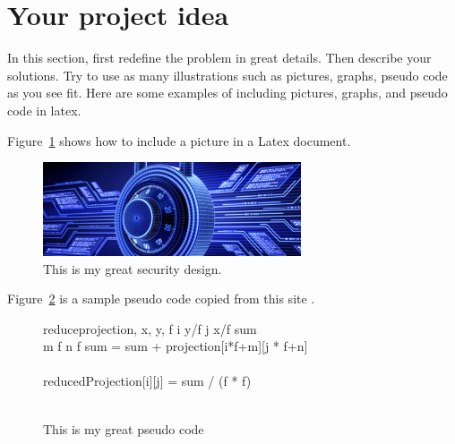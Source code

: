\section{Your project idea}

In this section, first  redefine the problem in great details. Then describe your solutions. Try to use as many illustrations such as pictures, graphs, pseudo code as you see fit. Here are some examples of including pictures, graphs, and pseudo code in latex. 

%
%
Figure~\ref{fig:fig1} shows how to include a picture in a Latex document. 
\begin{figure}[!ht]
 \centering
\includegraphics[width=3in]{sample_1}
\caption{\label{fig:fig1}This is my great security design.}
\end{figure}

%
%
Figure~\ref{fig:fig2} is a sample pseudo code copied from this site \cite{pseudocode}. 

\begin{figure}[!ht]
 \centering

  \begin{pseudocode}[framebox]{reduce}{projection, x, y, f}
    \FOR i  \TO y/f \DO
      \BEGIN
      \FOR j  \TO x/f \DO
        \BEGIN
        sum  \\
        \FOR m  \TO f \DO
          \BEGIN
          \FOR n  \TO f \DO
            sum = sum + projection[i*f+m][j * f+n]  \\
          \END \\
        reducedProjection[i][j] = sum / (f * f) \\
        \END
      \END \\
  \end{pseudocode}
  
  \caption{\label{fig:fig2}This is my great pseudo code}
  
  \end{figure}
  
